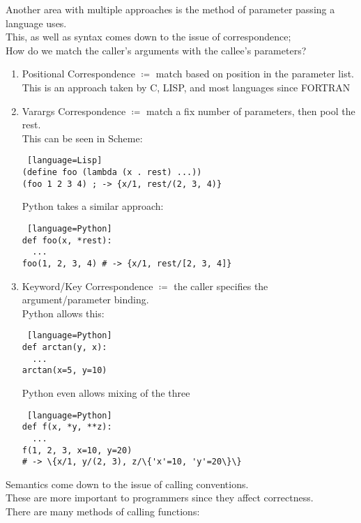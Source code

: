 \documentclass[../../lecture_notes.tex]{subfiles}
\begin{document}
Another area with multiple approaches is the method of parameter passing a language uses.\\
This, as well as syntax comes down to the issue of correspondence;\\
 How do we match the caller’s arguments with the callee’s parameters?
\begin{enumerate} [itemsep=0mm]
	\item Positional Correspondence $\coloneqq$ match based on position in the parameter list.\\
 		This is an approach taken by C, LISP, and most languages since FORTRAN
	\item Varargs Correspondence $\coloneqq$ match a fix number of parameters, then pool the rest.\\
		This can be seen in Scheme:
		\begin{lstlisting} [language=Lisp]
(define foo (lambda (x . rest) ...))
(foo 1 2 3 4) ; -> {x/1, rest/(2, 3, 4)}
		\end{lstlisting}
		Python takes a similar approach:
		\begin{lstlisting} [language=Python]
def foo(x, *rest):
  ...
foo(1, 2, 3, 4) # -> {x/1, rest/[2, 3, 4]}
		\end{lstlisting}
 	\item Keyword/Key Correspondence $\coloneqq$ the caller specifies the argument/parameter binding.\\
		Python allows this:
		\begin{lstlisting} [language=Python]
def arctan(y, x):
  ...
arctan(x=5, y=10)
		\end{lstlisting}
		Python even allows mixing of the three
		\begin{lstlisting} [language=Python]
def f(x, *y, **z):
  ...
f(1, 2, 3, x=10, y=20)
# -> \{x/1, y/(2, 3), z/\{'x'=10, 'y'=20\}\}
		\end{lstlisting} \smallskip
\end{enumerate}
\noindent Semantics come down to the issue of calling conventions.\\
These are more important to programmers since they affect correctness.\\
There are many methods of calling functions:
\end{document}

